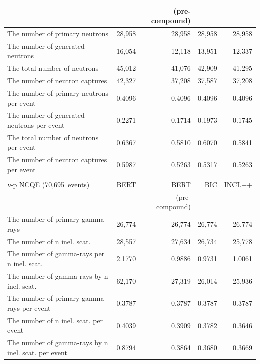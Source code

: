 \begin{table}[h]
\begin{tabular}{lrrrr}
		                                                    &         & (pre-compound) &         &         \\ \hline
		The number of primary neutrons                      &  28,958 &         28,958 &  28,958 &  28,958 \\
		The number of generated neutrons                    &  16,054 &         12,118 &  13,951 &  12,337 \\
		The total number of neutrons                        &  45,012 &         41,076 &  42,909 &  41,295 \\
		The number of neutron captures                      &  42,327 &         37,208 &  37,587 &  37,208 \\ \hline
		The number of primary neutrons per event            &  0.4096 &         0.4096 &  0.4096 &  0.4096 \\
		The number of generated neutrons per event          &  0.2271 &         0.1714 &  0.1973 &  0.1745 \\
		The total number of neutrons per event              &  0.6367 &         0.5810 &  0.6070 &  0.5841 \\
		The number of neutron captures per event            &  0.5987 &         0.5263 &  0.5317 &  0.5263 \\ \hline \hline
		&&& \\ \hline \hline
		$\bar{\nu}$-p NCQE (70,695~events)                  &    BERT &           BERT &     BIC &  INCL++ \\
		                                                    &         & (pre-compound) &         &         \\ \hline
		The number of primary gamma-rays                    &  26,774 &         26,774 &  26,774 &  26,774 \\
		The number of n inel. scat.                         &  28,557 &         27,634 &  26,734 &  25,778 \\
		The number of gamma-rays per n inel. scat.          &  2.1770 &         0.9886 &  0.9731 &  1.0061 \\
		The number of gamma-rays by n inel. scat.           &  62,170 &         27,319 &  26,014 &  25,936 \\ \hline
		The number of primary gamma-rays per event          &  0.3787 &         0.3787 &  0.3787 &  0.3787 \\
		The number of n inel. scat. per event               &  0.4039 &         0.3909 &  0.3782 &  0.3646 \\
		The number of gamma-rays by n inel. scat. per event &  0.8794 &         0.3864 &  0.3680 &  0.3669 \\ \hline \hline
	\end{tabular}
\end{table}

